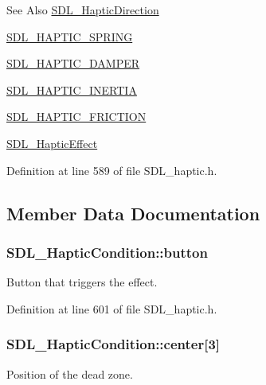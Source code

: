 \begin{DoxySeeAlso}{See Also}
\hyperlink{struct_s_d_l___haptic_direction}{S\-D\-L\-\_\-\-Haptic\-Direction} 

\hyperlink{_s_d_l__haptic_8h_a3b52d4700380085e2b5d87bb20320fb1}{S\-D\-L\-\_\-\-H\-A\-P\-T\-I\-C\-\_\-\-S\-P\-R\-I\-N\-G} 

\hyperlink{_s_d_l__haptic_8h_a69522f261973e3ea4273486141320a87}{S\-D\-L\-\_\-\-H\-A\-P\-T\-I\-C\-\_\-\-D\-A\-M\-P\-E\-R} 

\hyperlink{_s_d_l__haptic_8h_a14b807471589120395aec28293cf6642}{S\-D\-L\-\_\-\-H\-A\-P\-T\-I\-C\-\_\-\-I\-N\-E\-R\-T\-I\-A} 

\hyperlink{_s_d_l__haptic_8h_a98a5011311168d63921aaac21403a4d8}{S\-D\-L\-\_\-\-H\-A\-P\-T\-I\-C\-\_\-\-F\-R\-I\-C\-T\-I\-O\-N} 

\hyperlink{union_s_d_l___haptic_effect}{S\-D\-L\-\_\-\-Haptic\-Effect} 
\end{DoxySeeAlso}


Definition at line 589 of file S\-D\-L\-\_\-haptic.\-h.



\subsection{Member Data Documentation}
\hypertarget{struct_s_d_l___haptic_condition_acd35a9d432ad122bf7824b16974eac7a}{
\subsubsection[{button}]{ S\-D\-L\-\_\-\-Haptic\-Condition\-::button}}\label{struct_s_d_l___haptic_condition_acd35a9d432ad122bf7824b16974eac7a}
Button that triggers the effect. 

Definition at line 601 of file S\-D\-L\-\_\-haptic.\-h.

\hypertarget{struct_s_d_l___haptic_condition_a8a71ec28ff5ab85246cbc59736aa2c53}{
\subsubsection[{center}]{ S\-D\-L\-\_\-\-Haptic\-Condition\-::center\mbox{[}3\mbox{]}}}\label{struct_s_d_l___haptic_condition_a8a71ec28ff5ab85246cbc59736aa2c53}
Position of the dead zone. 

